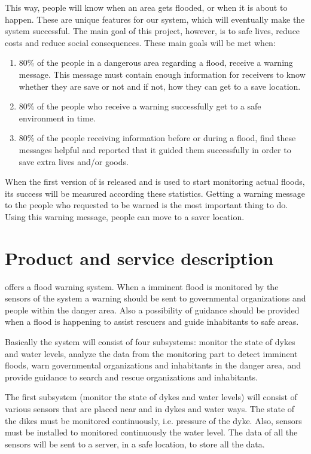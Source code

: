 This way, people will know when an area gets flooded, or when it is about to happen. 
These are unique features for our system, which will eventually make the system successful. The main goal of this project, however, is to safe lives, reduce costs and reduce social consequences. These main goals will be met when:
\begin{enumerate}
	\item 80\% of the people in a dangerous area regarding a flood, receive a warning message. This message must contain enough information for receivers to know whether they are save or not and if not, how they can get to a save location.
	\item 80\% of the people who receive a warning successfully get to a safe environment in time.
	\item 80\% of the people receiving information before or during a flood, find these messages helpful and reported that it guided them successfully in order to save extra lives and/or goods.
\end{enumerate}

When the first version of \ProjectName{} is released and is used to start monitoring actual floods, its success will be measured according these statistics. Getting a warning message to the people who requested to be warned is the most important thing to do. Using this warning message, people can move to a saver location.


\section{Product and service description}
\CompanyName{} offers a flood warning system. When a imminent flood is monitored by the sensors of the system a warning should be sent to governmental organizations and people within the danger area. Also a possibility of guidance should be provided when a flood is happening to assist rescuers and guide inhabitants to safe areas.

Basically the system will consist of four subsystems: monitor the state of dykes and water levels, analyze the data from the monitoring part to detect imminent floods, warn governmental organizations and inhabitants in the danger area, and provide guidance to search and rescue organizations and inhabitants.

The first subsystem (monitor the state of dykes and water levels) will consist of various sensors that are placed near and in dykes and water ways. The state of the dikes must be monitored continuously, i.e. pressure of the dyke. Also, sensors must be installed to monitored continuously the water level. The data of all the sensors will be sent to a server, in a safe location, to store all the data.

